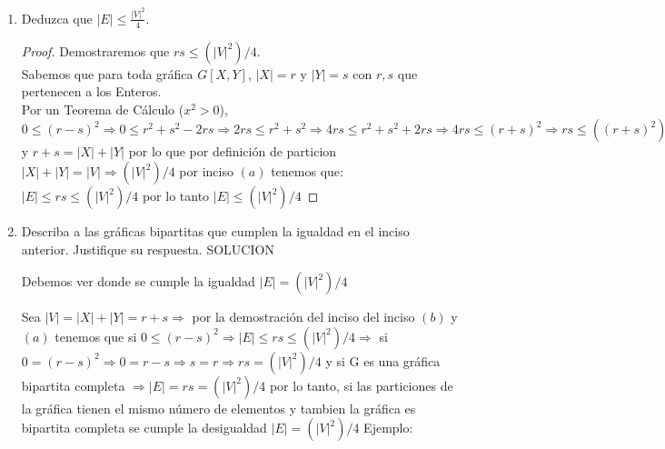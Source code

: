 \documentclass{article}
\begin{document}
\begin{enumerate}
\begin{enumerate}
\begin{proof}
          Por lo tanto, para toda $G(V, E)$ si $G[X,Y]$ con $|X|=r$ y $|Y|=s$, MAX$\{|E|\} = rs$.
        \end{proof}

      \item Deduzca que $|E| \le \frac{|V|^2}{4}$.
        \begin{proof}
          Demostraremos que $rs \leqslant (|V|^2)/4$. \\

          Sabemos que para toda gr\'afica $G[X,Y]$, $|X|=r$ y $|Y|=s$ con $r,s$ que pertenecen a los Enteros. \\
          Por un Teorema de C\'alculo ($x^2 > 0$), $0 \leqslant (r-s)^2  \Longrightarrow 0   \leqslant r^2 + s^2 -2rs \Longrightarrow 2rs \leqslant r^2 + s^2 \Longrightarrow 4rs \leqslant r^2 + s^2 + 2rs \Longrightarrow 4rs \leqslant (r+s)^2 \Longrightarrow rs \leqslant ((r+s)^2)/4 $ y $r+s = |X|+|Y|$ por lo que por definición de particion $|X| + |Y| = |V|  \Longrightarrow (|V|^2)/4$ por inciso $(a)$ tenemos que:  $|E|\leqslant rs \leqslant (|V|^2)/4$
           por lo tanto $ |E|\leqslant (|V|^2)/4 $

        \end{proof}
      \item Describa a las gr\'aficas bipartitas que cumplen la igualdad en el
      inciso anterior. Justifique su respuesta.
        SOLUCION

        Debemos ver donde se cumple la igualdad $|E|= (|V|^2)/4$

        Sea $|V|= |X| + |Y| = r+s \Longrightarrow$ por la demostración del inciso del inciso $(b)$ y $(a)$ tenemos que si $0\leqslant(r-s)^2 \Longrightarrow |E|\leqslant rs \leqslant (|V|^2)/4 \Longrightarrow$ si $0=(r-s)^2 \Longrightarrow 0=r-s \Longrightarrow s=r \Longrightarrow rs=(|V|^2)/4 $ y si G es una gráfica bipartita completa $\Longrightarrow |E|=rs=(|V|^2)/4$ por lo tanto, si las particiones de la gráfica tienen el mismo número de elementos y tambien la gráfica es bipartita completa se cumple la desigualdad $|E|= (|V|^2)/4$
        \newpage
        Ejemplo:
        \begin{figure}[ht!]
            \centering
\end{figure}
\end{enumerate}
\end{enumerate}
\end{document}
